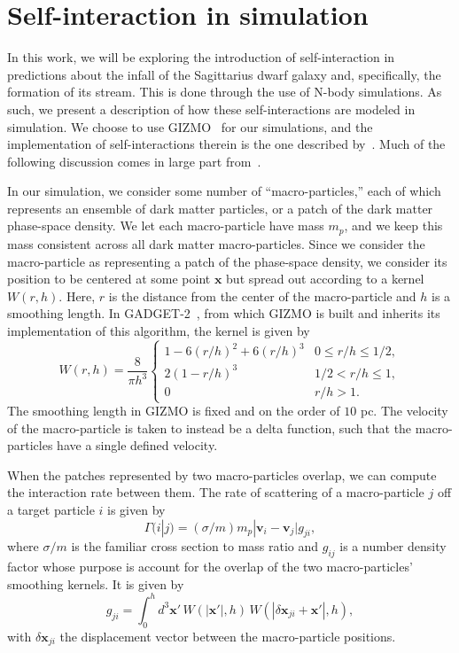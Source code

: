 \hypertarget{self-interaction-in-simulation}{%
\section{Self-interaction in simulation}\label{self-interaction-in-simulation}}

In this work, we will be exploring the introduction of self-interaction in
predictions about the infall of the Sagittarius dwarf galaxy and,
specifically, the formation of its stream. This is done through the use of
N-body simulations. As such, we present a description of how these
self-interactions are modeled in simulation. We choose to use
GIZMO~\cite{hopkins_new_2015} for our simulations, and the implementation of
self-interactions therein is the one described
by~\cite{rocha_cosmological_2013}. Much of the following discussion comes in
large part from~\cite{rocha_cosmological_2013}.

In our simulation, we consider some number of ``macro-particles,'' each
of which represents an ensemble of dark matter particles, or a patch of the
dark matter phase-space density. We let each macro-particle have mass
\(m_p\), and we keep this mass consistent across all dark matter
macro-particles. Since we consider the macro-particle as representing a
patch of the phase-space density, we consider its position to be
centered at some point \(\mathbf{x}\) but spread out according to a
kernel \(W(r,h)\). Here, \(r\) is the distance from the center of the
macro-particle and \(h\) is a smoothing length.  In
GADGET-2~\cite{springel_cosmological_2005}, from which GIZMO is built and
inherits its implementation of this algorithm, the kernel is given by
\begin{equation}
W(r,h) = \frac{8}{\pi h^3} \left\{ 
    \begin{array}{ll}
        1 - 6 (r/h)^2 + 6 (r/h)^3 & 0 \leq r/h \leq 1/2, \\
        2 (1 - r/h)^3 & 1/2 < r/h \leq 1, \\
        0 & r/h > 1.
    \end{array}
\right.
\end{equation}
The smoothing length in GIZMO is fixed and on the order of $10$ pc.  The
velocity of the macro-particle is taken to instead be a delta function, such
that the macro-particles have a single defined velocity.

When the patches represented by two macro-particles overlap, we can
compute the interaction rate between them. The rate of scattering of a
macro-particle \(j\) off a target particle \(i\) is given by
\begin{equation}
\Gamma(i|j) = (\sigma/m) m_p |\mathbf{v}_i - \mathbf{v}_j| g_{ji},
\end{equation}
where \(\sigma/m\) is the familiar cross section to mass ratio and
\(g_{ij}\) is a number density factor whose purpose is account for the
overlap of the two macro-particles' smoothing kernels. It is given by
\begin{equation}
g_{ji} = \int_{0}^{h} d^3 \mathbf{x}' \, W(|\mathbf{x}'|, h) \, 
W(|\delta \mathbf{x}_{ji} + \mathbf{x}'|, h),
\end{equation}
with \(\delta \mathbf{x}_{ji}\) the displacement vector between the
macro-particle positions.

